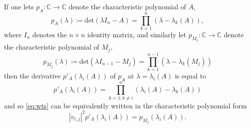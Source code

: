 \documentclass{amsart}
\newcommand\C{\mathbb{C}}
\begin{document}
If one lets $p_A: \C \to \C$ denote the characteristic polynomial of $A$,
\begin{equation}\label{pa-def}
 p_A(\lambda) \coloneqq \mathrm{det}(\lambda I_n - A) = \prod_{k=1}^n (\lambda - \lambda_k(A)),
\end{equation}
where $I_n$ denotes the $n \times n$ identity matrix, and similarly let $p_{M_j}: \C \to \C$ denote the characteristic polynomial of $M_j$,
$$ p_{M_j}(\lambda) \coloneqq \mathrm{det}(\lambda I_{n-1} - M_j) = \prod_{k=1}^{n-1} (\lambda - \lambda_k(M_j))$$
then the derivative $p'_A(\lambda_i(A))$ of $p_A$ at $\lambda = \lambda_i(A)$ is equal to
$$ p'_A(\lambda_i(A)) = \prod_{k=1;k\neq i}^{n}\left(\lambda_i(A)-\lambda_k(A)\right)$$
and so \eqref{eq:wts} can be equivalently written in the characteristic polynomial form
\begin{equation}\label{eq:wts-alt}
|v_{i,j}|^2 p'_A(\lambda_i(A))  = p_{M_j}(\lambda_i(A)).
\end{equation}
\end{document}
